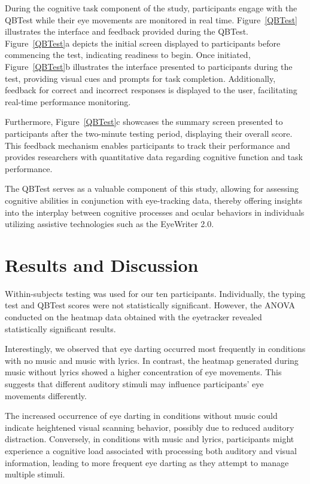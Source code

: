 \documentclass[manuscript, screen, review]{acmart} %
\begin{document}
During the cognitive task component of the study, participants engage with the QBTest while their eye movements are monitored in real time. Figure~\ref{QBTest} illustrates the interface and feedback provided during the QBTest. Figure~\ref{QBTest}a depicts the initial screen displayed to participants before commencing the test, indicating readiness to begin. Once initiated, Figure~\ref{QBTest}b illustrates the interface presented to participants during the test, providing visual cues and prompts for task completion. Additionally, feedback for correct and incorrect responses is displayed to the user, facilitating real-time performance monitoring.

Furthermore, Figure~\ref{QBTest}c showcases the summary screen presented to participants after the two-minute testing period, displaying their overall score. This feedback mechanism enables participants to track their performance and provides researchers with quantitative data regarding cognitive function and task performance.

The QBTest serves as a valuable component of this study, allowing for assessing cognitive abilities in conjunction with eye-tracking data, thereby offering insights into the interplay between cognitive processes and ocular behaviors in individuals utilizing assistive technologies such as the EyeWriter 2.0.

\section{Results and Discussion}
Within-subjects testing was used for our ten participants. Individually, the typing test and QBTest scores were not statistically significant. However, the ANOVA conducted on the heatmap data obtained with the eyetracker revealed statistically significant results.

Interestingly, we observed that eye darting occurred most frequently in conditions with no music and music with lyrics. In contrast, the heatmap generated during music without lyrics showed a higher concentration of eye movements. This suggests that different auditory stimuli may influence participants' eye movements differently.

The increased occurrence of eye darting in conditions without music could indicate heightened visual scanning behavior, possibly due to reduced auditory distraction. Conversely, in conditions with music and lyrics, participants might experience a cognitive load associated with processing both auditory and visual information, leading to more frequent eye darting as they attempt to manage multiple stimuli.
\end{document}
